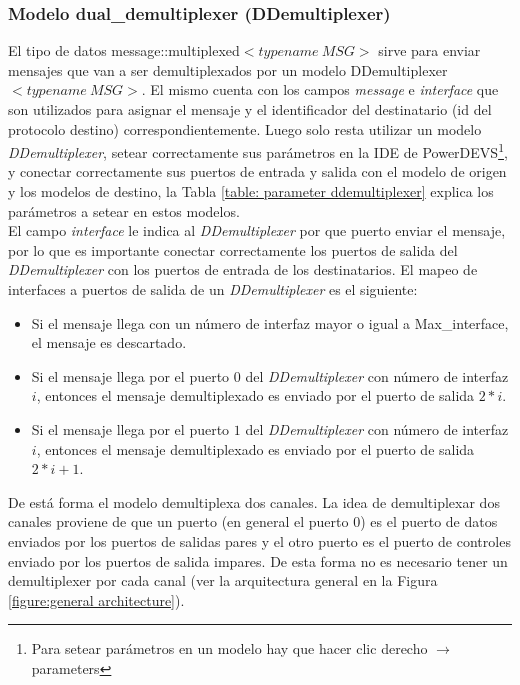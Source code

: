 \documentclass[10pt,a4paper]{article}
\begin{document}
\subsubsection{Modelo dual\_demultiplexer (DDemultiplexer)}

El tipo de datos message::multiplexed$<typename\ MSG>$ sirve para enviar mensajes que van a ser demultiplexados por un modelo DDemultiplexer$<typename\ MSG>$. El mismo cuenta con los campos \textit{message} e \textit{interface} que son utilizados para asignar el mensaje y el identificador del destinatario (id del protocolo destino) correspondientemente. Luego solo resta utilizar un modelo \textit{DDemultiplexer}, setear correctamente sus parámetros en la IDE de PowerDEVS\footnote{Para setear parámetros en un modelo hay que hacer clic derecho $\rightarrow$ parameters}, y conectar correctamente sus puertos de entrada y salida con el modelo de origen y los modelos de destino, la Tabla \ref{table: parameter ddemultiplexer} explica los parámetros a setear en estos modelos. \\

El campo \textit{interface} le indica al \textit{DDemultiplexer} por que puerto enviar el mensaje, por lo que es importante conectar correctamente los puertos de salida del \textit{DDemultiplexer} con los puertos de entrada de los destinatarios. El mapeo de interfaces a puertos de salida de un \textit{DDemultiplexer} es el siguiente: \\

\begin{itemize}
\item Si el mensaje llega con un número de interfaz mayor o igual a Max\_interface, el mensaje es descartado.
\item Si el mensaje llega por el puerto $0$ del \textit{DDemultiplexer} con número de interfaz $i$, entonces el mensaje demultiplexado es enviado por el puerto de salida $2*i$.
\item Si el mensaje llega por el puerto $1$ del \textit{DDemultiplexer} con número de interfaz $i$, entonces el mensaje demultiplexado es enviado por el puerto de salida $2*i + 1$.
\end{itemize}

De está forma el modelo demultiplexa dos canales. La idea de demultiplexar dos canales proviene de que un puerto (en general el puerto 0) es el puerto de datos enviados por los puertos de salidas pares y el otro puerto es el puerto de controles enviado por los puertos de salida impares. De esta forma no es necesario tener un demultiplexer por cada canal (ver la arquitectura general en la Figura \ref{figure:general architecture}). \\
\end{document}
